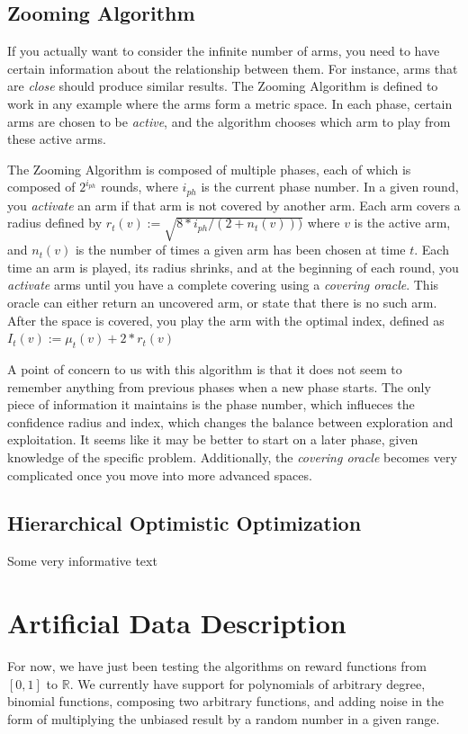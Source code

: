 \documentclass{article}
\begin{document}
\subsection{Zooming Algorithm}
If you actually want to consider the infinite number of arms, you need to have certain information about the relationship between them. For instance, arms that are \emph{close} should produce similar results. The Zooming Algorithm is defined to work in any example where the arms form a metric space. In each phase, certain arms are chosen to be \emph{active}, and the algorithm chooses which arm to play from these active arms.

The Zooming Algorithm is composed of multiple phases, each of which is composed of $2^{i_{ph}}$ rounds, where $i_{ph}$ is the current phase number. In a given round, you \emph{activate} an arm if that arm is not covered by another arm. Each arm covers a radius defined by $r_t(v):=\sqrt{8*i_{ph}/(2+n_t(v)))}$ where $v$ is the active arm, and $n_t(v)$ is the number of times a given arm has been chosen at time $t$. Each time an arm is played, its radius shrinks, and at the beginning of each round, you \emph{activate} arms until you have a complete covering using a \emph{covering oracle}. This oracle can either return an uncovered arm, or state that there is no such arm. After the space is covered, you play the arm with the optimal index, defined as $I_t(v):=\mu_t(v)+2*r_t(v)$

A point of concern to us with this algorithm is that it does not seem to remember anything from previous phases when a new phase starts. The only piece of information it maintains is the phase number, which influeces the confidence radius and index, which changes the balance between exploration and exploitation. It seems like it may be better to start on a later phase, given knowledge of the specific problem. Additionally, the \emph{covering oracle} becomes very complicated once you move into more advanced spaces.

\subsection{Hierarchical Optimistic Optimization}
Some very informative text

\section{Artificial Data Description}
For now, we have just been testing the algorithms on reward functions from
$[0,1]$ to $\mathbb{R}$.  We currently have support for polynomials
of arbitrary degree, binomial functions, composing two arbitrary functions,
and adding noise in the form of multiplying the unbiased result by a random
number in a given range.
\\
\end{document}

